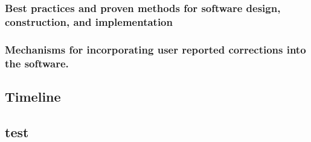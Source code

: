 \documentclass[11pt,notitlepage]{article}
\begin{document}
\subsubsection*{Best practices and proven methods for software design, construction, and implementation}
\subsubsection*{Mechanisms for incorporating user reported corrections into the software.}

\subsection*{Timeline}




\begin{table}[]
\caption{Timeline: The above timeline outlines our targets and milestones over the five year grant period.}
\label{Timeline}
\end{table}

\subsection*{test}
\end{document}
